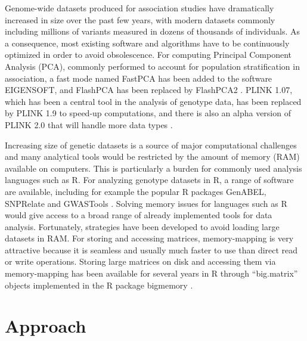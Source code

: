 \documentclass{bioinfo}
\begin{document}
Genome-wide datasets produced for association studies have dramatically increased in size over the past few years, with modern datasets commonly including millions of variants measured in dozens of thousands of individuals.
As a consequence, most existing software and algorithms have to be continuously optimized in order to avoid obsolescence. For computing Principal Component Analysis (PCA), commonly performed to account for population stratification in association, a fast mode named FastPCA has been added to the software EIGENSOFT, and FlashPCA has been replaced by FlashPCA2 \cite[]{Abraham2014a,Abraham2016a,Galinsky2016,Price2006}. 
PLINK 1.07, which has been a central tool in the analysis of genotype data, has been replaced by PLINK 1.9 to speed-up computations, and there is also an alpha version of PLINK 2.0 that will handle more data types \cite[]{chang2015second,Purcell2007}. 

Increasing size of genetic datasets is a source of major computational challenges and many analytical tools would be restricted by the amount of memory (RAM) available on computers.
This is particularly a burden for commonly used analysis languages such as R.
For analyzing genotype datasets in R, a range of software are available, including for example the popular R packages GenABEL, SNPRelate and GWASTools \cite[]{aulchenko2007genabel,Gogarten2012,zheng2012high}. 
Solving memory issues for languages such as R would give access to a broad range of already implemented tools for data analysis. Fortunately, strategies have been developed to avoid loading large datasets in RAM. For storing and accessing matrices, memory-mapping is very attractive because it is seamless and usually much faster to use than direct read or write operations. Storing large matrices on disk and accessing them via memory-mapping has been available for several years in R through ``big.matrix'' objects implemented in the R package bigmemory \cite[]{Kane2013}.

\section{Approach}
\end{document}
